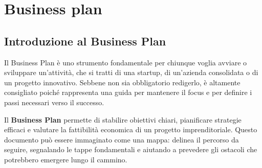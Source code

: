 \part{Business plan}
\chapter{Introduzione al Business Plan}
Il Business Plan è uno strumento fondamentale per chiunque voglia avviare o sviluppare un’attività, che si tratti di una startup, di un’azienda consolidata o di un progetto innovativo. Sebbene non sia obbligatorio redigerlo, è altamente consigliato poiché rappresenta una guida per mantenere il focus e per definire i passi necessari verso il successo.

\begin{redbar}
Il \textbf{Business Plan} permette di stabilire obiettivi chiari, pianificare strategie efficaci e valutare la fattibilità economica di un progetto imprenditoriale. Questo documento può essere immaginato come una mappa: delinea il percorso da seguire, segnalando le tappe fondamentali e aiutando a prevedere gli ostacoli che potrebbero emergere lungo il cammino.
\end{redbar}


